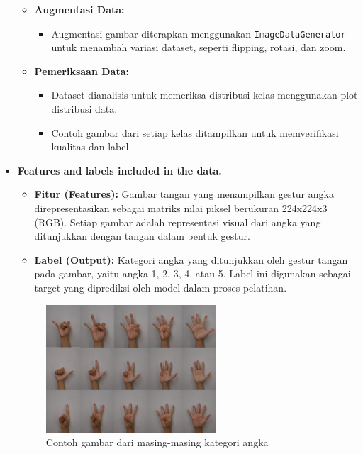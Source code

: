 \documentclass[12pt,a4paper]{article}
\begin{document}
\begin{itemize}
\begin{itemize}
    \item \textbf{Augmentasi Data:} 
    \begin{itemize}
        \item Augmentasi gambar diterapkan menggunakan \texttt {ImageDataGenerator} untuk menambah variasi dataset, seperti flipping, rotasi, dan zoom.
    \end{itemize}

    \item \textbf{Pemeriksaan Data:}

    \begin{itemize}
        \item Dataset dianalisis untuk memeriksa distribusi kelas menggunakan plot distribusi data.
        \item Contoh gambar dari setiap kelas ditampilkan untuk memverifikasi kualitas dan label.
    \end{itemize}

\end{itemize}

    \item  \textbf{Features and labels included in the data.}
    \begin{itemize}
    \item \textbf{Fitur (Features):} 
    Gambar tangan yang menampilkan gestur angka direpresentasikan sebagai matriks nilai piksel berukuran 224x224x3 (RGB). Setiap gambar adalah representasi visual dari angka yang ditunjukkan dengan tangan dalam bentuk gestur.
    
    \item \textbf{Label (Output):} 
    Kategori angka yang ditunjukkan oleh gestur tangan pada gambar, yaitu angka 1, 2, 3, 4, atau 5. Label ini digunakan sebagai target yang diprediksi oleh model dalam proses pelatihan.
\end{itemize}

\begin{figure}[h]
    \centering
    \includegraphics[width=0.6\textwidth]{Image/Contoh Tangan.jpeg}
    \caption{Contoh gambar dari masing-masing kategori angka}
    \label{fig:hand_gesture_example}
\end{figure}



\end{itemize}
\end{document}
